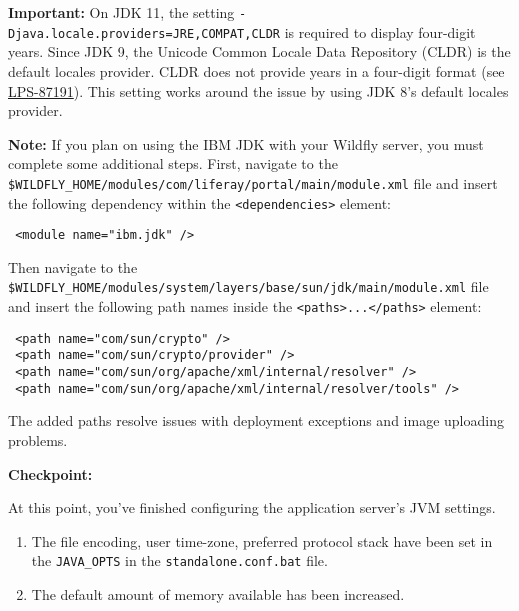 \noindent\hrulefill

\noindent\hrulefill

\textbf{Important:} On JDK 11, the setting
\texttt{-Djava.locale.providers=JRE,COMPAT,CLDR} is required to display
four-digit years. Since JDK 9, the Unicode Common Locale Data Repository
(CLDR) is the default locales provider. CLDR does not provide years in a
four-digit format (see
\href{https://issues.liferay.com/browse/LPS-87191}{LPS-87191}). This
setting works around the issue by using JDK 8's default locales
provider.

\noindent\hrulefill

\noindent\hrulefill

\textbf{Note:} If you plan on using the IBM JDK with your Wildfly
server, you must complete some additional steps. First, navigate to the
\texttt{\$WILDFLY\_HOME/modules/com/liferay/portal/main/module.xml} file
and insert the following dependency within the
\texttt{\textless{}dependencies\textgreater{}} element:

\begin{verbatim}
 <module name="ibm.jdk" />
\end{verbatim}

Then navigate to the
\texttt{\$WILDFLY\_HOME/modules/system/layers/base/sun/jdk/main/module.xml}
file and insert the following path names inside the
\texttt{\textless{}paths\textgreater{}...\textless{}/paths\textgreater{}}
element:

\begin{verbatim}
 <path name="com/sun/crypto" />
 <path name="com/sun/crypto/provider" />
 <path name="com/sun/org/apache/xml/internal/resolver" />
 <path name="com/sun/org/apache/xml/internal/resolver/tools" />
\end{verbatim}

The added paths resolve issues with deployment exceptions and image
uploading problems.

\noindent\hrulefill

\textbf{Checkpoint:}

At this point, you've finished configuring the application server's JVM
settings.

\begin{enumerate}
\def\labelenumi{\arabic{enumi}.}
\item
  The file encoding, user time-zone, preferred protocol stack have been
  set in the \texttt{JAVA\_OPTS} in the \texttt{standalone.conf.bat}
  file.
\item
  The default amount of memory available has been increased.
\end{enumerate}

